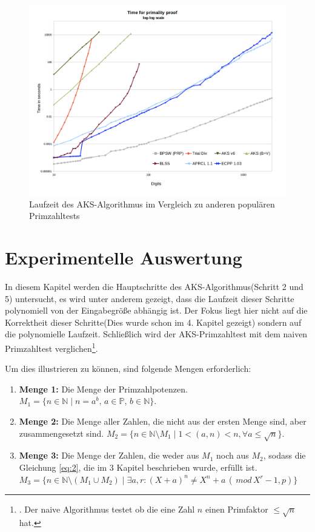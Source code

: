 \documentclass[12pt,oneside]{article}
\theoremstyle{remark}
\theoremstyle{definition}
\begin{document}
\begin{figure}[h]
\includegraphics[width=13cm]{plots/Screenshot 2020-04-23 at 02.12.06.png}
\centering
\caption{\small{Laufzeit des AKS-Algorithmus im Vergleich zu anderen populären Primzahltests}}
\end{figure}

\newpage

\section{Experimentelle Auswertung}
In diesem Kapitel werden die Hauptschritte des AKS-Algorithmus(Schritt 2 und 5) untersucht, es wird unter anderem gezeigt, dass die Laufzeit dieser Schritte polynomiell von der Eingabegröße abhängig ist. Der Fokus liegt hier nicht auf die Korrektheit dieser Schritte(Dies wurde schon im 4. Kapitel gezeigt) sondern auf die polynomielle Laufzeit. Schließlich wird der AKS-Primzahltest mit dem naiven Primzahltest verglichen\footnote{. Der naive Algorithmus testet ob die eine Zahl $n$ einen Primfaktor $\leq  \sqrt{n}$ hat.}. 

Um dies illustrieren zu können, sind folgende Mengen erforderlich:
\begin{enumerate}
    \item \textbf{Menge 1:} Die Menge der Primzahlpotenzen.\newline
    $M_1 = \{ n \in \mathbb{N} \mid n = a^b, \, a \in \mathbb{P}, \, b \in \mathbb{N}\}$.\newline
    
    \item \textbf{Menge 2:} Die Menge aller Zahlen, die nicht aus der ersten Menge sind, aber zusammengesetzt sind. $M_2 = \{ n \in \mathbb{N}\setminus	 M_1 \mid 1 < (a,n) < n, \forall a \leq \sqrt{n} \}$.\newline
    
    \item \textbf{Menge 3:} Die Menge der Zahlen, die weder aus $M_1$ noch aus $M_2$, sodass die Gleichung \ref{eq:2}, die im 3 Kapitel beschrieben wurde, erfüllt ist. $M_3 = \{ n \in \mathbb{N} \setminus (M_1 \cup M_2) \mid \exists a,r : (X + a)^n \neq X^n + a \, (\, mod \, X^r - 1,p) \}$
\end{enumerate}
\end{document}
